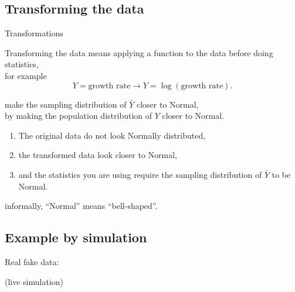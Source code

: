 \subsection{Transforming the data}

\begin{frame}{Transformations}

    \begin{block}{Transforming the data}
        means applying a function to the data before doing statistics,\\
        for example
        \[  Y = \text{growth rate} \longrightarrow Y = \log( \text{growth rate} ). \]
    \end{block}

    \vspace{2em}

     make the sampling distribution of $\bar Y$ closer to Normal,\\
    by making the population distribution of $Y$ closer to Normal.

    \vspace{2em}

    \begin{enumerate}
        \item The original data do not look Normally distributed,
        \item the transformed data look closer to Normal,
        \item and the statistics you are using require the sampling distribution of $\bar Y$ to be Normal.
    \end{enumerate}

    \vspace{2em}

     informally, ``Normal'' means ``bell-shaped''.

\end{frame}


\subsection{Example by simulation}

\begin{frame}{Real fake data:}
    
  \begin{center}
    (live simulation)
  \end{center}

\end{frame}



